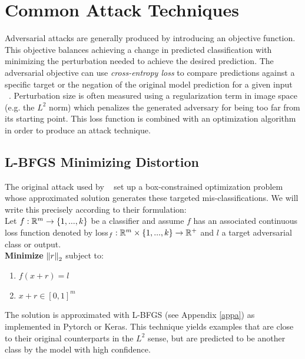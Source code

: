 \section{Common Attack Techniques}
Adversarial attacks are generally produced by introducing an objective
function. This objective balances achieving a change in predicted
classification with minimizing the perturbation needed to achieve the
desired prediction. The adversarial objective can use \emph{cross-entropy
loss} to compare predictions against a specific target or the negation
of the original model prediction for a given input
~\citep{good1963maximum}. Perturbation size is often measured using a
regularization term in image space (e.g. the $L^2$ norm) which
penalizes the generated adversary for being too far from its starting
point. This loss function is combined with an optimization algorithm
in order to produce an attack technique. 

\subsection{L-BFGS Minimizing Distortion}\label{lbfgs}

The original attack used by ~\citet{szegedy2013} set up a
box-constrained optimization problem whose approximated solution
generates these targeted mis-classifications. We will write this
precisely according to their formulation: \\

Let $f : \mathbb{R}^m \to \{1,...,k\}$ be a classifier and assume $f$ has an
associated continuous loss function denoted by loss$_f : \mathbb{R}^m \times
\{1,...,k\} \to \mathbb{R}^+$ and $l$ a target adversarial class or output. \\
\textbf{ Minimize} $\left\Vert r \right\Vert_2$ subject to:
\begin{enumerate}[1.]
\item $f(x + r) = l$
\item $x + r \in [0,1]^m$
\end{enumerate}

The solution is approximated with L-BFGS (see Appendix \ref{appa}) as
implemented in Pytorch or Keras. This technique yields examples that
are close to their original counterparts in the $L^2$ sense, but are
predicted to be another class by the model with high confidence.  \\


